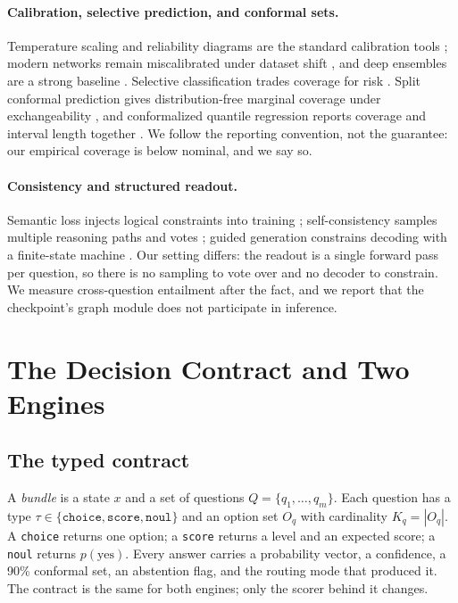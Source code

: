 \documentclass[11pt]{article}
\begin{document}
\paragraph{Calibration, selective prediction, and conformal sets.}
Temperature scaling and reliability diagrams are the standard calibration tools \citep{guo2017calibration}; modern networks remain miscalibrated under dataset shift \citep{ovadia2019uncertainty}, and deep ensembles are a strong baseline \citep{lakshminarayanan2017ensembles}. Selective classification trades coverage for risk \citep{geifman2017selective,geifman2019selectivenet}. Split conformal prediction gives distribution-free marginal coverage under exchangeability \citep{lei2018distribution,angelopoulos2021gentle}, and conformalized quantile regression reports coverage and interval length together \citep{romano2019cqr}. We follow the reporting convention, not the guarantee: our empirical coverage is below nominal, and we say so.

\paragraph{Consistency and structured readout.}
Semantic loss injects logical constraints into training \citep{xu2018semantic}; self-consistency samples multiple reasoning paths and votes \citep{wang2023selfconsistency}; guided generation constrains decoding with a finite-state machine \citep{willard2023guided}. Our setting differs: the readout is a single forward pass per question, so there is no sampling to vote over and no decoder to constrain. We measure cross-question entailment after the fact, and we report that the checkpoint's graph module does not participate in inference.

\section{The Decision Contract and Two Engines}
\label{sec:contract}

\subsection{The typed contract}
A \emph{bundle} is a state $x$ and a set of questions $Q=\{q_1,\dots,q_m\}$. Each question has a type $\tau\in\{\texttt{choice},\texttt{score},\texttt{noul}\}$ and an option set $O_q$ with cardinality $K_q=|O_q|$. A \texttt{choice} returns one option; a \texttt{score} returns a level and an expected score; a \texttt{noul} returns $p(\text{yes})$. Every answer carries a probability vector, a confidence, a 90\% conformal set, an abstention flag, and the routing mode that produced it. The contract is the same for both engines; only the scorer behind it changes.
\end{document}
